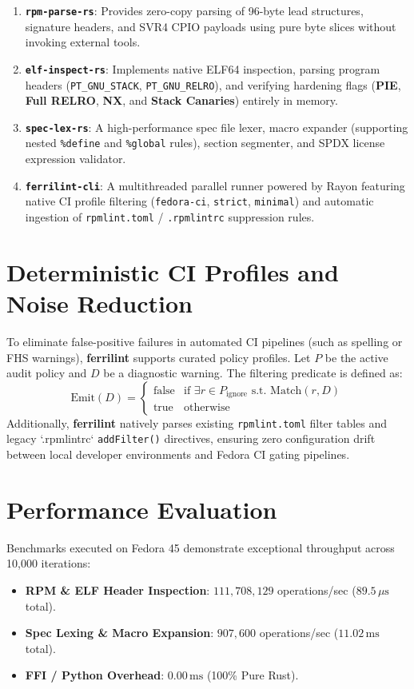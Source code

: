 \documentclass[11pt,a4paper]{article}
\begin{document}
\begin{enumerate}
    \item \textbf{\texttt{rpm-parse-rs}}: Provides zero-copy parsing of 96-byte lead structures, signature headers, and SVR4 CPIO payloads using pure byte slices without invoking external tools.
    \item \textbf{\texttt{elf-inspect-rs}}: Implements native ELF64 inspection, parsing program headers (\texttt{PT_GNU_STACK}, \texttt{PT_GNU_RELRO}), and verifying hardening flags (\textbf{PIE}, \textbf{Full RELRO}, \textbf{NX}, and \textbf{Stack Canaries}) entirely in memory.
    \item \textbf{\texttt{spec-lex-rs}}: A high-performance spec file lexer, macro expander (supporting nested \texttt{\%define} and \texttt{\%global} rules), section segmenter, and SPDX license expression validator.
    \item \textbf{\texttt{ferrilint-cli}}: A multithreaded parallel runner powered by Rayon featuring native CI profile filtering (\texttt{fedora-ci}, \texttt{strict}, \texttt{minimal}) and automatic ingestion of \texttt{rpmlint.toml} / \texttt{.rpmlintrc} suppression rules.
\end{enumerate}

\section{Deterministic CI Profiles and Noise Reduction}
To eliminate false-positive failures in automated CI pipelines (such as spelling or FHS warnings), \textbf{ferrilint} supports curated policy profiles. Let $P$ be the active audit policy and $D$ be a diagnostic warning. The filtering predicate is defined as:
\begin{equation}
\text{Emit}(D) = \begin{cases} 
\text{false} & \text{if } \exists r \in P_{\text{ignore}} \text{ s.t. } \text{Match}(r, D) \\ 
\text{true} & \text{otherwise}
\end{cases}
\end{equation}
Additionally, \textbf{ferrilint} natively parses existing \texttt{rpmlint.toml} filter tables and legacy `.rpmlintrc` \texttt{addFilter()} directives, ensuring zero configuration drift between local developer environments and Fedora CI gating pipelines.

\section{Performance Evaluation}
Benchmarks executed on Fedora 45 demonstrate exceptional throughput across 10,000 iterations:
\begin{itemize}
    \item \textbf{RPM \& ELF Header Inspection}: $111,708,129$ operations/sec ($89.5\,\mu\text{s}$ total).
    \item \textbf{Spec Lexing & Macro Expansion}: $907,600$ operations/sec ($11.02\,\text{ms}$ total).
    \item \textbf{FFI / Python Overhead}: $0.00\,\text{ms}$ (100\% Pure Rust).
\end{itemize}
\end{document}
